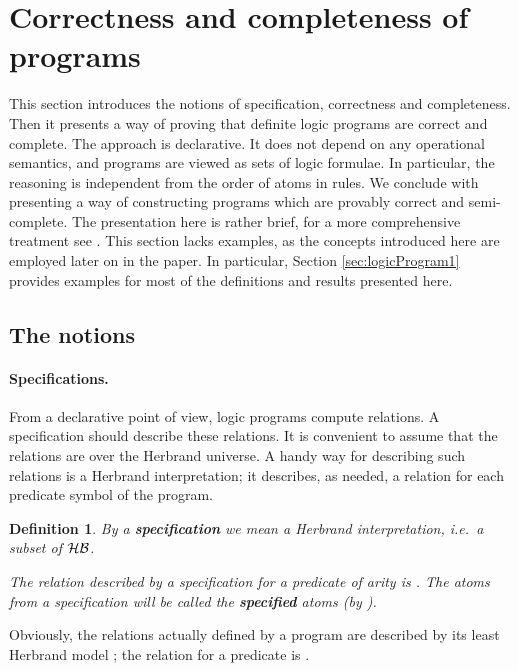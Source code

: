 \documentclass{tlp}
\newtheorem{definition}[theorem]{Definition}
\newcommand*{\HB}{{\ensuremath{\cal{H B}}}\xspace}
\begin{document}
\section{Correctness and completeness of programs}
\label{sec:corr-compl}
This section introduces the notions of specification, correctness and
completeness.  Then it presents a way of proving that definite logic programs
are correct and complete.  The approach is declarative.  
It does not depend on any operational semantics, and
programs are viewed as sets of logic formulae.
In particular, the reasoning is independent from the order of atoms in rules.
We conclude with presenting a way of constructing programs which are provably
correct and semi-complete.
The presentation here is rather brief,
for a more comprehensive treatment see  \cite{drabent.tocl16}.
This section lacks examples,
as the concepts introduced here are employed later on in the paper.
In particular, Section \ref{sec:logicProgram1} provides examples 
for most of the definitions and results presented here.



\subsection{The notions}
\label{subsec:notions}

\paragraph{Specifications.}
From a declarative point of view, logic programs compute relations. 
A specification should describe these relations.
It is convenient to assume that the relations are over the Herbrand universe. 
A handy way for describing such relations is a Herbrand interpretation;
it describes, as needed, a relation for each predicate symbol of the program.
\begin{definition}
  \label{def:specification}
  By a {\bf specification} we mean a Herbrand interpretation, i.e.\ a
  subset of \HB.

The relation described by a specification  for a predicate 
  of arity  is
  {}.
The atoms from a specification  will be called the 
  {\bf specified} atoms (by ).
\sloppy
\end{definition}
Obviously,
 the relations actually defined by a program  are described by its
least {Herbrand} model ; the relation for a predicate  is
{.}
\end{document}
